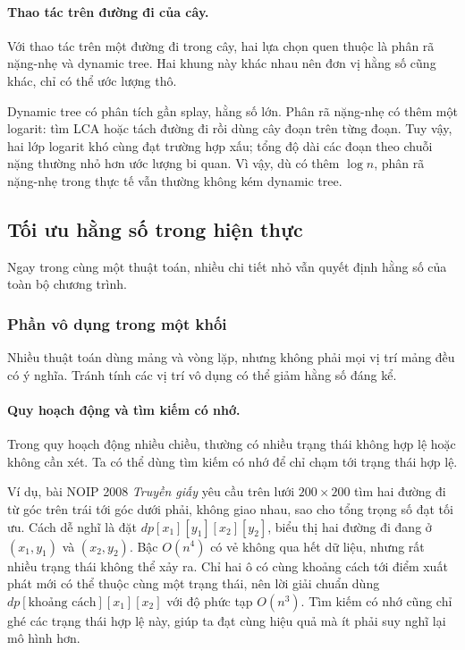 \documentclass[11pt]{article}
\begin{document}
\paragraph{Thao tác trên đường đi của cây.}
Với thao tác trên một đường đi trong cây, hai lựa chọn quen thuộc là phân rã
nặng-nhẹ và dynamic tree. Hai khung này khác nhau nên đơn vị hằng số cũng khác,
chỉ có thể ước lượng thô.

Dynamic tree có phân tích gần splay, hằng số lớn. Phân rã nặng-nhẹ có thêm một
logarit: tìm LCA hoặc tách đường đi rồi dùng cây đoạn trên từng đoạn. Tuy vậy,
hai lớp logarit khó cùng đạt trường hợp xấu; tổng độ dài các đoạn theo chuỗi
nặng thường nhỏ hơn ước lượng bi quan. Vì vậy, dù có thêm \(\log n\), phân rã
nặng-nhẹ trong thực tế vẫn thường không kém dynamic tree.

\subsection{Tối ưu hằng số trong hiện thực}

Ngay trong cùng một thuật toán, nhiều chi tiết nhỏ vẫn quyết định hằng số của
toàn bộ chương trình.

\subsubsection{Phần vô dụng trong một khối}

Nhiều thuật toán dùng mảng và vòng lặp, nhưng không phải mọi vị trí mảng đều có
ý nghĩa. Tránh tính các vị trí vô dụng có thể giảm hằng số đáng kể.

\paragraph{Quy hoạch động và tìm kiếm có nhớ.}
Trong quy hoạch động nhiều chiều, thường có nhiều trạng thái không hợp lệ hoặc
không cần xét. Ta có thể dùng tìm kiếm có nhớ để chỉ chạm tới trạng thái hợp
lệ.

Ví dụ, bài NOIP 2008 \emph{Truyền giấy} yêu cầu trên lưới \(200\times200\) tìm
hai đường đi từ góc trên trái tới góc dưới phải, không giao nhau, sao cho tổng
trọng số đạt tối ưu. Cách dễ nghĩ là đặt
\(\mathit{dp}[x_1][y_1][x_2][y_2]\), biểu thị hai đường đi đang ở
\((x_1,y_1)\) và \((x_2,y_2)\). Bậc \(O(n^4)\) có vẻ không qua hết dữ liệu,
nhưng rất nhiều trạng thái không thể xảy ra. Chỉ hai ô có cùng khoảng cách tới
điểm xuất phát mới có thể thuộc cùng một trạng thái, nên lời giải chuẩn dùng
\(\mathit{dp}[\text{khoảng cách}][x_1][x_2]\) với độ phức tạp \(O(n^3)\). Tìm
kiếm có nhớ cũng chỉ ghé các trạng thái hợp lệ này, giúp ta đạt cùng hiệu quả
mà ít phải suy nghĩ lại mô hình hơn.
\end{document}
